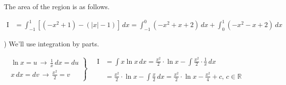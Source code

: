 \documentclass{article}
\begin{document}
\hfill

\noindent The area of the region is as follows.

\begin{align*}\mathrm{I} & = \int_{-1}^1\left[(-x^2+1) - (|x|-1)\right]\, dx = \int_{-1}^0(-x^2+x +2)\, dx +\int_{0}^1(-x^2-x+2)\, dx\end{align*}

\hfill

) We'll use integration by parts.

\[
\left.
\begin{array}{ll}
\displaystyle\ln x=u\,\rightarrow\,\frac1x\,dx=du  \\
\displaystyle x\,dx= dv \,\rightarrow\,\frac{x^2}2=v
\end{array}
\right\}\quad
\begin{array}{ll}
\mathrm{I}&=\displaystyle\int x\ln x\,dx = \frac{x^2}2\cdot\ln x-\int\frac{x^2}2\cdot \frac1x \,dx \\\\&=\displaystyle\frac{x^2}2\cdot\ln x-\int\frac{x}2\,dx=\boxed{\frac{x^2}2\cdot\ln x - \frac{x^2}4+c,\,c\in\mathbb{R}}
\end{array}
\]
\end{document}
